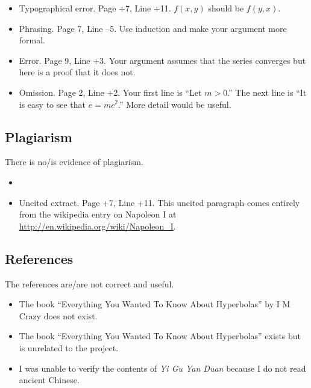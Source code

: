 \documentclass[11pt]{article}
\begin{document}
\begin{itemize}
\item Typographical error. Page +7, Line +11. $f(x,y)$ should be $f(y,x)$.
\item Phrasing. Page 7, Line --5. Use induction and make your argument more formal.
\item Error. Page 9, Line +3. Your argument assumes that the series converges but here is a proof that it does not.
\item Omission. Page 2, Line +2. Your first line is ``Let $m > 0$.'' The next line is ``It is easy to see that $e = mc^2$.'' More detail would be useful.
\end{itemize}

\subsection*{Plagiarism}

There is no/is evidence of plagiarism.

\begin{itemize}
\item 
\item Uncited extract. Page +7, Line +11. This uncited paragraph comes entirely from the wikipedia entry on Napoleon I at \url{http://en.wikipedia.org/wiki/Napoleon_I}.
\end{itemize}

\subsection*{References}

The references are/are not correct and useful.

\begin{itemize}
\item The book ``Everything You Wanted To Know About Hyperbolas'' by I M Crazy does not exist.
\item The book ``Everything You Wanted To Know About Hyperbolas'' exists but is unrelated to the project.
\item I was unable to verify the contents of {\em Yi Gu Yan Duan} because I do not read ancient Chinese.
\end{itemize}
\end{document}
